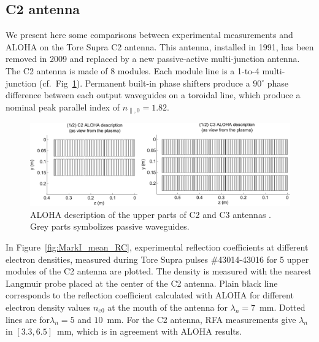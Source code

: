 \subsection{C2 antenna}
We present here some comparisons between experimental measurements and ALOHA on the Tore Supra C2 antenna. This antenna, installed in 1991, has been removed in 2009 and replaced by a new passive-active multi-junction antenna\cite{guilhem2009,guilhem2011}. The C2 antenna is made of 8 modules. Each module line is a 1-to-4 multi-junction (cf.~Fig~\ref{fig:geometry_TS_LHAntennas}). Permanent built-in phase shifters produce a $90^\circ$ phase difference between each output waveguides on a toroidal line, which produce a nominal peak parallel index of $n_{\parallel,0}=1.82$.

\begin{figure}[h]
	\centering
	\includegraphics[width=1.0\textwidth]{figures/chap2/Tore_Supra/geometry_TS_LHAntennas}
	\caption{ALOHA description of the upper parts of C2 and C3 antennas . Grey parts symbolizes passive waveguides.}
	\label{fig:geometry_TS_LHAntennas}
\end{figure}

In Figure~\ref{fig:MarkI_mean_RC}, experimental reflection coefficients at different electron densities, measured during Tore Supra pulses \#43014-43016 for 5 upper modules of the C2 antenna are plotted. The density is measured with the nearest Langmuir probe placed at the center of the C2 antenna. Plain black line corresponds to the reflection coefficient calculated with ALOHA for different electron density values $n_{e0}$ at the mouth of the antenna for $\lambda_n=7$~mm. Dotted lines are for$\lambda_n=5$ and $10$~mm. For the C2 antenna, RFA measurements give $\lambda_n$ in $[3.3, 6.5]$~mm, which is in agreement with ALOHA results. 

